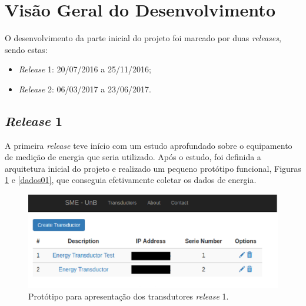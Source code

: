 \section{Visão Geral do Desenvolvimento}
O desenvolvimento da parte inicial do projeto foi marcado por duas \textit{releases}, sendo estas:

\begin{itemize}
    \item \textit{Release} 1: 20/07/2016 a 25/11/2016;
    \item \textit{Release} 2: 06/03/2017 a 23/06/2017.
\end{itemize}

\subsection{\textit{Release} 1}
A primeira \textit{release} teve início com um estudo aprofundado sobre o equipamento de medição de energia que seria utilizado. Após o estudo, foi definida a arquitetura inicial do projeto e realizado um pequeno protótipo funcional, Figuras \ref{dados02} e \ref{dados01}, que conseguia efetivamente coletar os dados de energia.

\begin{figure}[!htb]
    \centering
    \includegraphics[keepaspectratio=true,scale=0.5]{figuras/coleta_dados_02.eps}
    \caption{Protótipo para apresentação dos transdutores \textit{release} 1.}
    \label{dados02}
\end{figure}

